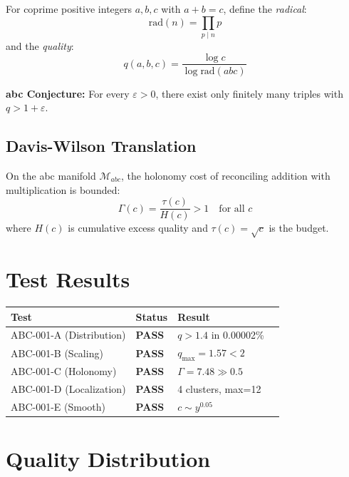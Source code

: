\documentclass[12pt]{article}
\begin{document}
For coprime positive integers $a, b, c$ with $a + b = c$, define the \emph{radical}:
\begin{equation}
\text{rad}(n) = \prod_{p \mid n} p
\end{equation}
and the \emph{quality}:
\begin{equation}
q(a,b,c) = \frac{\log c}{\log \text{rad}(abc)}
\end{equation}

\textbf{abc Conjecture:} For every $\varepsilon > 0$, there exist only finitely many triples with $q > 1 + \varepsilon$.

\subsection{Davis-Wilson Translation}

On the abc manifold $\mathcal{M}_{abc}$, the holonomy cost of reconciling addition with multiplication is bounded:
\begin{equation}
\Gamma(c) = \frac{\tau(c)}{H(c)} > 1 \quad \text{for all } c
\end{equation}
where $H(c)$ is cumulative excess quality and $\tau(c) = \sqrt{c}$ is the budget.

\section{Test Results}

\begin{center}
\begin{tabular}{llll}
\toprule
\textbf{Test} & \textbf{Status} & \textbf{Result} \\
\midrule
ABC-001-A (Distribution) & \textbf{PASS} & $q > 1.4$ in 0.00002\% \\
ABC-001-B (Scaling) & \textbf{PASS} & $q_{\max} = 1.57 < 2$ \\
ABC-001-C (Holonomy) & \textbf{PASS} & $\Gamma = 7.48 \gg 0.5$ \\
ABC-001-D (Localization) & \textbf{PASS} & 4 clusters, max=12 \\
ABC-001-E (Smooth) & \textbf{PASS} & $c \sim y^{0.05}$ \\
\bottomrule
\end{tabular}
\end{center}

\section{Quality Distribution}
\end{document}
